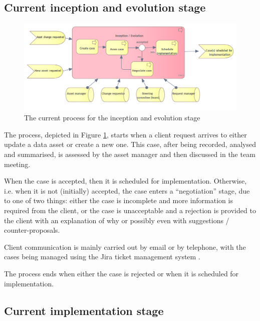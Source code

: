 	\subsection{Current inception and evolution stage}
	\label{sec:inception-current}
	
	\begin{figure}[h]
		\centering
		\includegraphics[width=.8\textwidth]{images/business/current/InceptionEvolution.png}
		\caption{The current process for the inception and evolution stage}
		\label{fig:evolution-current}
	\end{figure}		
	
	The process, depicted in Figure \ref{fig:evolution-current}, starts when a client request arrives to either update a data asset or create a new one. This case, after being recorded, analysed and summarised, is assessed by the asset manager and then discussed in the team meeting. 
	
	
	When the case is accepted, then it is scheduled for implementation. Otherwise, i.e. when it is not (initially) accepted, the case enters a ``negotiation'' stage, due to one of two things: either the case is incomplete and more information is required from the client, or the case is unacceptable and a rejection is provided to the client with an explanation of why or possibly even with suggestions / counter-proposals. 
	
	Client communication is mainly carried out by email or by telephone, with the cases being managed using the Jira ticket management system \citep{jira}. 
	
	The process ends when either the case is rejected or when it is scheduled for implementation. 

	
	\subsection{Current implementation stage}
	\label{sec:implementation-current}
		
